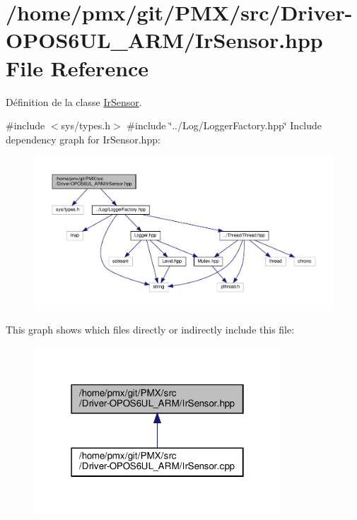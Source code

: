 \hypertarget{Driver-OPOS6UL__ARM_2IrSensor_8hpp}{}\section{/home/pmx/git/\+P\+M\+X/src/\+Driver-\/\+O\+P\+O\+S6\+U\+L\+\_\+\+A\+R\+M/\+Ir\+Sensor.hpp File Reference}
\label{Driver-OPOS6UL__ARM_2IrSensor_8hpp}


Définition de la classe \hyperlink{classIrSensor}{Ir\+Sensor}.  


{\ttfamily \#include $<$sys/types.\+h$>$}\newline
{\ttfamily \#include \char`\"{}../\+Log/\+Logger\+Factory.\+hpp\char`\"{}}\newline
Include dependency graph for Ir\+Sensor.\+hpp\+:
\nopagebreak
\begin{figure}[H]
\begin{center}
\leavevmode
\includegraphics[width=350pt]{Driver-OPOS6UL__ARM_2IrSensor_8hpp__incl}
\end{center}
\end{figure}
This graph shows which files directly or indirectly include this file\+:
\nopagebreak
\begin{figure}[H]
\begin{center}
\leavevmode
\includegraphics[width=262pt]{Driver-OPOS6UL__ARM_2IrSensor_8hpp__dep__incl}
\end{center}
\end{figure}
